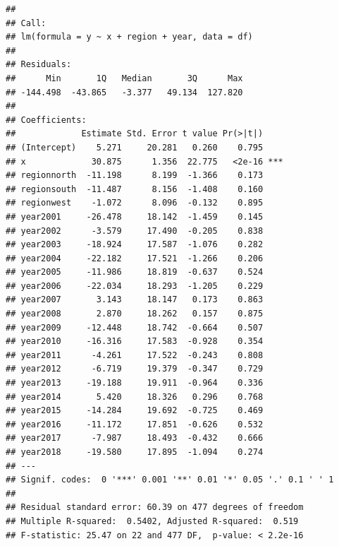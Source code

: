 \documentclass[]{book}
\theoremstyle{definition}
\theoremstyle{definition}
\theoremstyle{definition}
\theoremstyle{remark}
\begin{document}
\begin{verbatim}
## 
## Call:
## lm(formula = y ~ x + region + year, data = df)
## 
## Residuals:
##      Min       1Q   Median       3Q      Max 
## -144.498  -43.865   -3.377   49.134  127.820 
## 
## Coefficients:
##             Estimate Std. Error t value Pr(>|t|)    
## (Intercept)    5.271     20.281   0.260    0.795    
## x             30.875      1.356  22.775   <2e-16 ***
## regionnorth  -11.198      8.199  -1.366    0.173    
## regionsouth  -11.487      8.156  -1.408    0.160    
## regionwest    -1.072      8.096  -0.132    0.895    
## year2001     -26.478     18.142  -1.459    0.145    
## year2002      -3.579     17.490  -0.205    0.838    
## year2003     -18.924     17.587  -1.076    0.282    
## year2004     -22.182     17.521  -1.266    0.206    
## year2005     -11.986     18.819  -0.637    0.524    
## year2006     -22.034     18.293  -1.205    0.229    
## year2007       3.143     18.147   0.173    0.863    
## year2008       2.870     18.262   0.157    0.875    
## year2009     -12.448     18.742  -0.664    0.507    
## year2010     -16.316     17.583  -0.928    0.354    
## year2011      -4.261     17.522  -0.243    0.808    
## year2012      -6.719     19.379  -0.347    0.729    
## year2013     -19.188     19.911  -0.964    0.336    
## year2014       5.420     18.326   0.296    0.768    
## year2015     -14.284     19.692  -0.725    0.469    
## year2016     -11.172     17.851  -0.626    0.532    
## year2017      -7.987     18.493  -0.432    0.666    
## year2018     -19.580     17.895  -1.094    0.274    
## ---
## Signif. codes:  0 '***' 0.001 '**' 0.01 '*' 0.05 '.' 0.1 ' ' 1
## 
## Residual standard error: 60.39 on 477 degrees of freedom
## Multiple R-squared:  0.5402, Adjusted R-squared:  0.519 
## F-statistic: 25.47 on 22 and 477 DF,  p-value: < 2.2e-16
\end{verbatim}
\end{document}
